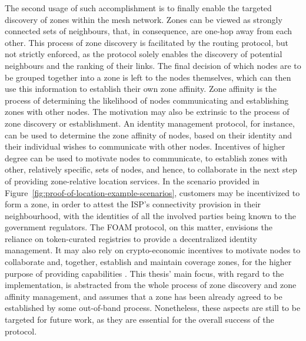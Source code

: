 The second usage of such accomplishment is to finally enable the targeted discovery of zones within the mesh network. Zones can be viewed as strongly connected sets of neighbours, that, in consequence, are one-hop away from each other. This process of zone discovery is facilitated by the routing protocol, but not strictly enforced, as the protocol solely enables the discovery of potential neighbours and the ranking of their links. The final decision of which nodes are to be grouped together into a zone is left to the nodes themselves, which can then use this information to establish their own zone affinity. Zone affinity is the process of determining the likelihood of nodes communicating and establishing zones with other nodes. The motivation may also be extrinsic to the process of zone discovery or establishment. An identity management protocol, for instance, can be used to determine the zone affinity of nodes, based on their identity and their individual wishes to communicate with other nodes. Incentives of higher degree can be used to motivate nodes to communicate, to establish zones with other, relatively specific, sets of nodes, and hence, to collaborate in the next step of providing zone-relative location services. In the scenario provided in Figure~\ref{fig:proof-of-location-example-scenarios}, customers may be incentivized to form a zone, in order to attest the ISP's connectivity provision in their neighbourhood, with the identities of all the involved parties being known to the government regulators. The FOAM protocol, on this matter, envisions the reliance on token-curated registries to provide a decentralized identity management. It may also rely on crypto-economic incentives to motivate nodes to collaborate and, together, establish and maintain coverage zones, for the higher purpose of providing \pol{} capabilities \cite{foam-white-paper}. This thesis' main focus, with regard to the \poc{} implementation, is abstracted from the whole process of zone discovery and zone affinity management, and assumes that a zone has been already agreed to be established by some out-of-band process. Nonetheless, these aspects are still to be targeted for future work, as they are essential for the overall success of the protocol.

